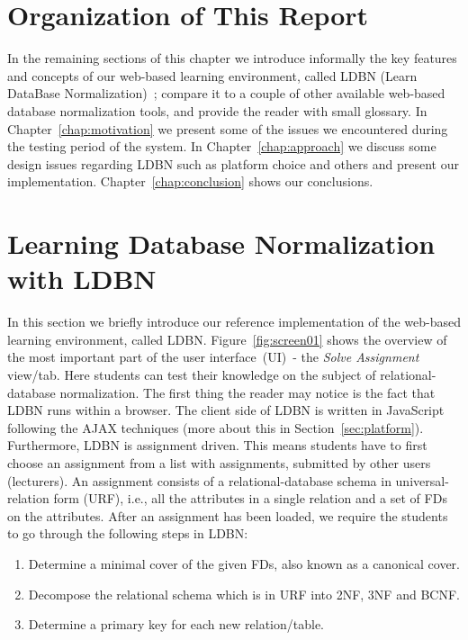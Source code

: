 \section{Organization of This Report}
\label{sec:organization}
In the remaining sections of this chapter we introduce informally 
the key features and concepts of our web-based learning environment, 
called LDBN (Learn DataBase Normalization)~\cite{wldbn}; 
compare it to a couple of other 
available web-based database normalization tools, and provide the reader with small glossary.  
In Chapter~\ref{chap:motivation} we present some of the issues we encountered during the testing period
of the system. 
In Chapter~\ref{chap:approach} we discuss some design issues regarding LDBN such as 
platform choice and others and present our implementation.  
Chapter~\ref{chap:conclusion} shows our conclusions.

\section{Learning Database Normalization with LDBN}
\label{sec:introldbn}
In this section we briefly introduce our reference implementation
of the web-based learning environment, called LDBN.    
Figure~\ref{fig:screen01} shows the overview of the most important part of the 
user interface~(UI)~- 
the \textit{Solve Assignment} view/tab. Here students can test their knowledge on 
the subject of relational-database normalization. The first thing the reader 
may notice is the fact that LDBN runs within a browser. The client side 
of LDBN is written in JavaScript following the AJAX techniques 
(more about this in Section~\ref{sec:platform}). 
Furthermore, LDBN is assignment driven. This means students have to first 
choose an assignment 
from a list with assignments, submitted by other users (lecturers). 
An assignment consists of a relational-database schema in
universal-relation form (URF), i.e., all the attributes in a single relation 
and a set of FDs on the attributes. 
After an assignment has been loaded, we require the students to go through the 
following steps in LDBN:
\begin{enumerate}
	\item Determine a minimal cover of the given FDs, also known as a canonical cover.
	\item Decompose the relational schema which is in URF into 2NF, 3NF and BCNF. 
	\item Determine a primary key for each new relation/table. 
\end{enumerate}


